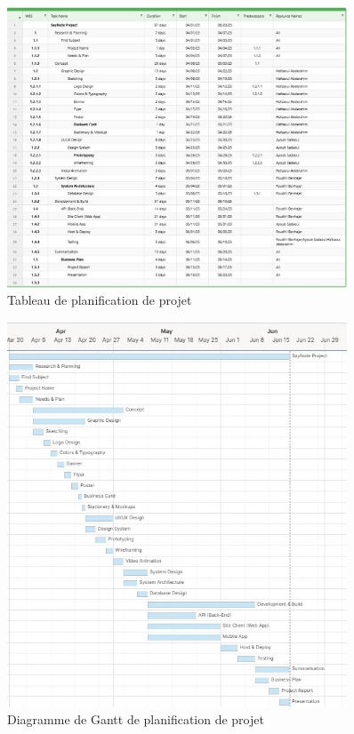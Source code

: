         \begin{figure}[htbp]
        \centering
        \includegraphics[width=0.9\textwidth]{assets/docs/planification_table.png}
        \caption{Tableau de planification de projet}
        \label{fig:planification_table}
    \end{figure}
    
        \begin{figure}[htbp]
        \centering
        \includegraphics[width=0.9\textwidth]{assets/docs/gantt_chart.png}
        \caption{Diagramme de Gantt de planification de projet}
        \label{fig:gantt_chart}
    \end{figure}
    
